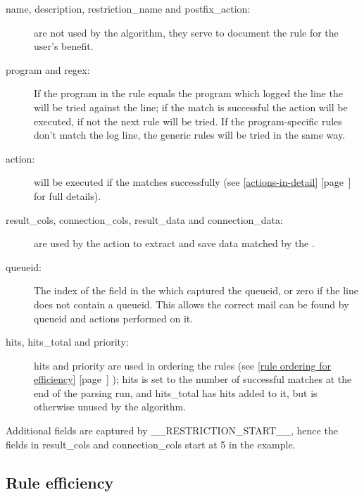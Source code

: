 \documentclass[a4paper,12pt,draft]{article}
\newcommand{\refwithpage}[1]{%
    \empty{}\ref{#1} [page~\pageref{#1}]%
}
\newcommand{\sectionref}[1]{%
    \textsection{}\refwithpage{#1}%
}
\begin{document}
\begin{description}

    \item [name, description, restriction\_name and postfix\_action:] are
        not \newline used by the algorithm, they serve to document the rule
        for the user's benefit.

    \item [program and regex:] If the program in the rule equals the
        program which logged the line the \regex{} will be tried against
        the line; if the match is successful the action will be executed,
        if not the next rule will be tried.  If the program-specific rules
        don't match the log line, the generic rules will be tried in the
        same way.

    \item [action:] will be executed if the \regex{} matches successfully
        (see \sectionref{actions-in-detail} for full details).

    \item [result\_cols, connection\_cols, result\_data and
        connection\_data:] are \newline used by the action to extract and
        save data matched by the \regex{}.

    \item [queueid:] The index of the field in the \regex{} which captured
        the queueid, or zero if the line does not contain a queueid.  This
        allows the correct mail can be found by queueid and actions
        performed on it.

    \item [hits, hits\_total and priority:] hits and priority are used in
        ordering the rules (see \sectionref{rule ordering for efficiency});
        hits is set to the number of successful matches at the end of the
        parsing run, and hits\_total has hits added to it, but is otherwise
        unused by the algorithm.

\end{description}

Additional fields are captured by \_\_RESTRICTION\_START\_\_, hence the
fields in result\_cols and connection\_cols start at 5 in the example.


\subsection{Rule efficiency}
\end{document}
